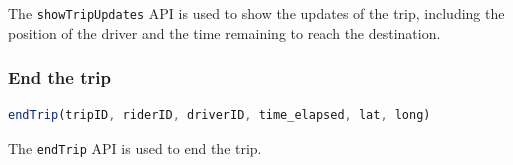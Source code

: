 The \texttt{showTripUpdates} API is used to show the updates of the trip, including the position of the driver and the time remaining to reach the destination.

\subsubsection{End the trip}\label{nOuUyfeeuUbBbDhNsoOWb}

\begin{lstlisting}[language=JavaScript]
endTrip(tripID, riderID, driverID, time_elapsed, lat, long)
\end{lstlisting}

The \texttt{endTrip} API is used to end the trip.

